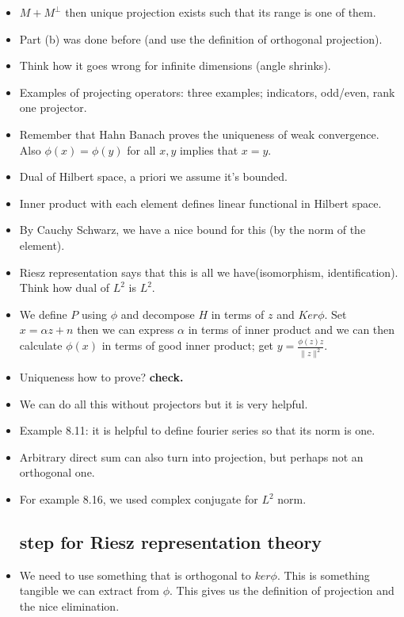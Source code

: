 \documentclass{article}
\theoremstyle{remark}
\begin{document}
\begin{itemize}
\item $M+M^\perp$ then unique projection exists such that its range is one of them.
\item Part (b) was done before (and use the definition of orthogonal projection).
\item Think how it goes wrong for infinite dimensions (angle shrinks).
\item Examples of projecting operators: three examples; indicators, odd/even, rank one projector.
\item Remember that Hahn Banach proves the uniqueness of weak convergence. Also $\phi(x)=\phi(y)$ for all $x,y$ implies that $x=y$.
\item Dual of Hilbert space, a priori we assume it's bounded.
\item Inner product with each element defines linear functional in Hilbert space.
\item By Cauchy Schwarz, we have a nice bound for this (by the norm of the element).
\item Riesz representation says that this is all we have(isomorphism, identification). Think how dual of $L^2$ is $L^2$.
\item We define $P$ using $\phi$ and decompose $H$ in terms of $z$ and $Ker \phi$. Set $x=\alpha z+n$ then we can express $\alpha$ in terms of inner product and we can then calculate $\phi(x)$ in terms of good inner product; get $y=\frac{\phi(z)z}{\lVert z\rVert^2}$.
\item Uniqueness how to prove? \textbf{check.}
\item We can do all this without projectors but it is very helpful.
\item Example 8.11: it is helpful to define fourier series so that its norm is one. 
\item Arbitrary direct sum can also turn into projection, but perhaps not an orthogonal one.
\item For example 8.16, we used complex conjugate for $L^2$ norm.




\subsection*{step for Riesz representation theory}
\item We need to use something that is orthogonal to $ker\phi$. This is something tangible we can extract from $\phi$. This gives us the definition of projection and the nice elimination.






\end{itemize}
\end{document}
